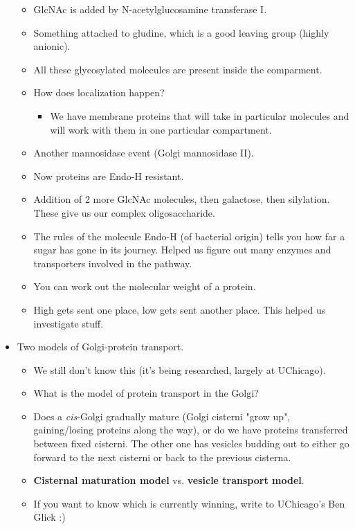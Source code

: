\documentclass[../notes.tex]{subfiles}
\begin{document}
\begin{itemize}
\begin{itemize}
        \item GlcNAc is added by N-acetylglucosamine transferase I.
        \item Something attached to gludine, which is a good leaving group (highly anionic).
        \item All these glycosylated molecules are present inside the comparment.
        \item How does localization happen?
        \begin{itemize}
            \item We have membrane proteins that will take in particular molecules and will work with them in one particular compartment.
        \end{itemize}
        \item Another mannosidase event (Golgi mannosidase II).
        \item Now proteins are Endo-H resistant.
        \item Addition of 2 more GlcNAc molecules, then galactose, then silylation. These give us our complex oligosaccharide.
        \item The rules of the molecule Endo-H (of bacterial origin) tells you how far a sugar has gone in its journey. Helped us figure out many enzymes and transporters involved in the pathway.
        \item You can work out the molecular weight of a protein.
        \item High gets sent one place, low gets sent another place. This helped us investigate stuff.
    \end{itemize}
    \item Two models of Golgi-protein transport.
    \begin{itemize}
        \item We still don't know this (it's being researched, largely at UChicago).
        \item What is the model of protein transport in the Golgi?
        \item Does a \emph{cis}-Golgi gradually mature (Golgi cisterni "grow up", gaining/losing proteins along the way), or do we have proteins transferred between fixed cisterni. The other one has vesicles budding out to either go forward to the next cisterni or back to the previous cisterna.
        \item \textbf{Cisternal maturation model} vs. \textbf{vesicle transport model}.
        \item If you want to know which is currently winning, write to UChicago's Ben Glick :)

\end{itemize}
\end{itemize}
\end{document}
